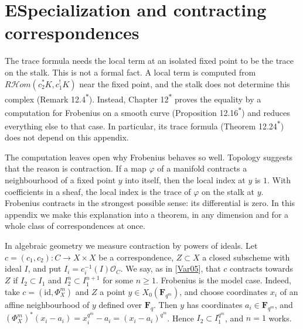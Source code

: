 \documentclass[11pt]{article}
\newcommand{\bpout}[1]{#1\textsuperscript{\hyperlink{bp-outside}{\ensuremath{\ast}}}}
\providecommand{\cHom}{}\renewcommand{\cHom}{R\mathcal{H}\!om}
\begin{document}
\section*{\texorpdfstring{E\quad Specialization and contracting correspondences}{E Specialization and contracting correspondences}}
\label{bp221}%
\label{bp222}%
The trace formula needs the local term at an isolated fixed point to be the trace on the stalk. This is not a formal fact. A local term is computed from \(\cHom(c_2^*K,c_1^!K)\) near the fixed point, and the stalk does not determine this complex (Remark \bpout{12.4}). Instead, Chapter \bpout{12} proves the equality by a computation for Frobenius on a smooth curve (Proposition \bpout{12.16}) and reduces everything else to that case. In particular, its trace formula (Theorem \bpout{12.24}) does not depend on this appendix.

The computation leaves open why Frobenius behaves so well. Topology suggests that the reason is contraction. If a map \(\varphi\) of a manifold contracts a neighbourhood of a fixed point \(y\) into itself, then the local index at \(y\) is \(1\). With coefficients in a sheaf, the local index is the trace of \(\varphi\) on the stalk at \(y\). Frobenius contracts in the strongest possible sense: its differential is zero. In this appendix we make this explanation into a theorem, in any dimension and for a whole class of correspondences at once.

In algebraic geometry we measure contraction by powers of ideals. Let \(c=(c_1,c_2):C\to X\times X\) be a correspondence, \(Z\subset X\) a closed subscheme with ideal \(I\), and put \(I_i=c_i^{-1}(I)\mathcal O_C\). We say, as in [\hyperref[bp347]{Var05}], that \(c\) contracts towards \(Z\) if \(I_2\subset I_1\) and \(I_2^n\subset I_1^{n+1}\) for some \(n\geq1\). Frobenius is the model case. Indeed, take \(c=(\mathrm{id},\Phi_X^m)\) and \(Z\) a point \(y\in X_0(\mathbf F_{q^m})\), and choose coordinates \(x_i\) of an affine neighbourhood of \(y\) defined over \(\mathbf F_q\). Then \(y\) has coordinates \(a_i\in\mathbf F_{q^m}\), and \((\Phi_X^m)^*(x_i-a_i)=x_i^{q^m}-a_i=(x_i-a_i)^{q^m}\). Hence \(I_2\subset I_1^{q^m}\), and \(n=1\) works.
\end{document}
